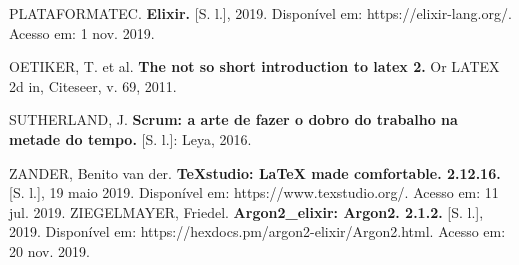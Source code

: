 \documentclass[article,12pt,oneside,a4paper,english,brazil,sumario=tradicional]{abntex2}
\begin{document}
PLATAFORMATEC. \textbf{Elixir.} [S. l.], 2019. Disponível em: https://elixir-lang.org/. Acesso em: 1 nov. 2019.

OETIKER, T. et al. \textbf{The not so short introduction to latex 2.} Or LATEX 2d in, Citeseer, v. 69, 2011.

SUTHERLAND, J. \textbf{Scrum: a arte de fazer o dobro do trabalho na metade do tempo.} [S. l.]: Leya, 2016.

ZANDER, Benito van der. \textbf{TeXstudio: LaTeX made comfortable. 2.12.16.} [S. l.], 19 maio 2019. Disponível em: https://www.texstudio.org/. Acesso em: 11 jul. 2019.
ZIEGELMAYER, Friedel. \textbf{Argon2_elixir: Argon2. 2.1.2.} [S. l.], 2019. Disponível em: https://hexdocs.pm/argon2-elixir/Argon2.html. Acesso em: 20 nov. 2019.
\end{document}
